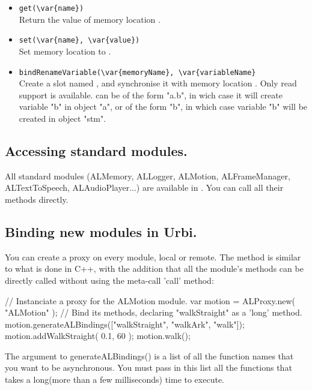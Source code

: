 \begin{itemize}
\item \lstinline|get(\var{name})| \\
  Return the value of memory location .
\item \lstinline|set(\var{name}, \var{value})| \\
  Set memory location  to .
\item \lstinline|bindRenameVariable(\var{memoryName}, \var{variableName}| \\
  Create a \us slot named , and synchronise it with memory
  location . Only read support is available.
   can be of the form "a.b", in wich case it will create
  variable "b" in object "a", or of the form "b", in which case variable "b"
  will be created in object "stm".
\end{itemize}

\subsection{Accessing standard \naoqi modules.}

All standard \naoqi modules (ALMemory, ALLogger, ALMotion, ALFrameManager,
ALTextToSpeech, ALAudioPlayer...) are available in \urbi. You can call all
their methods directly.

\subsection{Binding new \naoqi modules in Urbi.}

You can create a proxy on every \naoqi module, local or remote.
The method is similar to what is done in C++, with the addition that all the
module's methods can be directly called without using the meta-call 'call'
method:

\begin{urbiunchecked}
// Instanciate a proxy for the ALMotion module.
var motion = ALProxy.new( "ALMotion" );
// Bind its methods, declaring "walkStraight" as a 'long' method.
motion.generateALBindings(["walkStraight", "walkArk", "walk"]);
motion.addWalkStraight( 0.1, 60 );
motion.walk();
\end{urbiunchecked}

The argument to generateALBindings() is a list of all the function
names that you want to be asynchronous. You must pass in this list
all the functions that takes a long(more than a few milliseconds)
time to execute.

